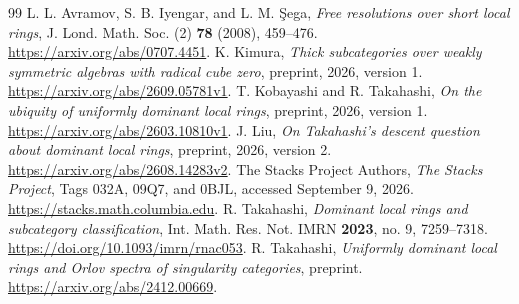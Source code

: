 \documentclass[11pt]{article}
\theoremstyle{remark}\newtheorem{remark}[theorem]{Remark}
\begin{document}
\begin{thebibliography}{99}
 L. L. Avramov, S. B. Iyengar, and L. M. \c Sega,
\emph{Free resolutions over short local rings}, J. Lond. Math. Soc. (2) \textbf{78} (2008), 459--476.
\url{https://arxiv.org/abs/0707.4451}.
 K. Kimura, \emph{Thick subcategories over weakly symmetric algebras with radical cube zero}, preprint, 2026, version 1.
\url{https://arxiv.org/abs/2609.05781v1}.
 T. Kobayashi and R. Takahashi, \emph{On the ubiquity of uniformly dominant local rings}, preprint, 2026, version 1.
\url{https://arxiv.org/abs/2603.10810v1}.
 J. Liu, \emph{On Takahashi's descent question about dominant local rings}, preprint, 2026, version 2.
\url{https://arxiv.org/abs/2608.14283v2}.
 The Stacks Project Authors, \emph{The Stacks Project}, Tags 032A, 09Q7, and 0BJL, accessed September 9, 2026.
\url{https://stacks.math.columbia.edu}.
 R. Takahashi, \emph{Dominant local rings and subcategory classification}, Int. Math. Res. Not. IMRN \textbf{2023}, no. 9, 7259--7318.
\url{https://doi.org/10.1093/imrn/rnac053}.
 R. Takahashi, \emph{Uniformly dominant local rings and Orlov spectra of singularity categories}, preprint.
\url{https://arxiv.org/abs/2412.00669}.
\end{thebibliography}
\end{document}
